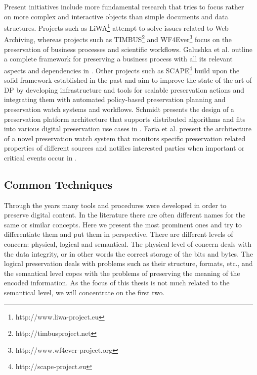 Present initiatives include more fundamental research that tries to focus rather on more complex and interactive objects than simple documents and data structures. Projects such as LiWA\footnote{http://www.liwa-project.eu} attempt to solve issues related to Web Archiving, whereas projects such as TIMBUS\footnote{http://timbusproject.net} and WF4Ever\footnote{http://www.wf4ever-project.org} focus on the preservation of business processes and scientific workflows. Galushka et al. outline a complete framework for preserving a business process with all its relevant aspects and dependencies in \cite{galushka-ipres2012}.
Other projects such as SCAPE\footnote{http://scape-project.eu} build upon the solid framework established in the past and aim to improve the state of the art of DP by developing infrastructure and tools for scalable preservation actions and integrating them with automated policy-based preservation planning and preservation watch systems and workflows. Schmidt presents the design of a preservation platform architecture that supports distributed algorithms and fits into various digital preservation use cases in \cite{schmidt-ipres2012}. Faria et al. present the architecture of a novel preservation watch system that monitors specific preservation related properties of different sources and notifies interested parties when important or critical events occur in \cite{FariaPDBFR12}.

\subsection{Common Techniques}
Through the years many tools and procedures were developed in order to preserve digital content. In the literature there are often different names for the same or similar concepts. Here we present the most prominent ones and try to differentiate them and put them in perspective. There are different levels of concern: physical, logical and semantical.
The physical level of concern deals with the data integrity, or in other words the correct storage of the bits and bytes. The logical preservation deals with problems such as their structure, formats, etc., and the semantical level copes with the problems of preserving the meaning of the encoded information. As the focus of this thesis is not much related to the semantical level, we will concentrate on the first two. \newline

